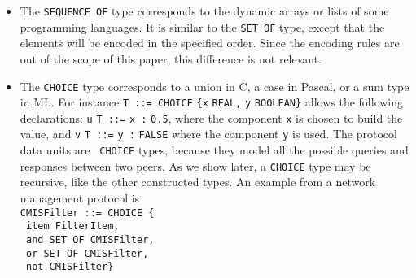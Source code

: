 \begin{itemize}
  \item The \texttt{\small SEQUENCE OF} type corresponds to the dynamic
        arrays or lists of some programming languages. It is similar
        to the \texttt{\small SET OF} type, except that the elements
        will be encoded in the specified order. Since the encoding
        rules are out of the scope of this paper, this difference is
        not relevant.

  \item The \texttt{\small CHOICE} type corresponds to a
        \textsf{union} in C, a \textsf{case} in Pascal, or a sum type
        in ML. For instance \texttt{\small T ::= CHOICE}
        \verb+{+\texttt{x} \texttt{\small REAL,} \texttt{y}
        \texttt{\small BOOLEAN}\verb+}+ allows the following
        declarations: \texttt{u} \texttt{\small T ::=} \texttt{x :}
        \texttt{\small 0.5}, where the component \texttt{x} is chosen
        to build the value, and \texttt{v} \texttt{\small T ::=}
        \texttt{y :} \texttt{\small FALSE} where the component
        \texttt{y} is used. The protocol data units are \texttt{\small
        CHOICE} types, because they model all the possible queries and
        responses between two peers. As we show later, a
        \texttt{\small CHOICE} type may be recursive, like the other
        constructed types. An example from a network management
        protocol is\\ {\small \verb+CMISFilter ::= CHOICE {+\\
        \verb+ item FilterItem,+\\ \verb+ and SET OF CMISFilter,+\\
        \verb+ or SET OF CMISFilter,+\\ \verb+ not CMISFilter}+}

\end{itemize}
